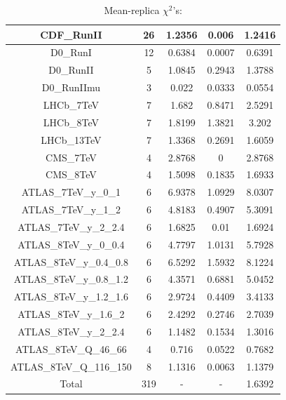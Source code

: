 \documentclass[
]{article}
\begin{document}
\begin{table}[h]
\begin{tabular}{|c|c|c|c|c|}
CDF\_RunII & 26 & 1.2356 & 0.006 & 1.2416 \\ \hline
D0\_RunI & 12 & 0.6384 & 0.0007 & 0.6391 \\ \hline
D0\_RunII & 5 & 1.0845 & 0.2943 & 1.3788 \\ \hline
D0\_RunIImu & 3 & 0.022 & 0.0333 & 0.0554 \\ \hline
LHCb\_7TeV & 7 & 1.682 & 0.8471 & 2.5291 \\ \hline
LHCb\_8TeV & 7 & 1.8199 & 1.3821 & 3.202 \\ \hline
LHCb\_13TeV & 7 & 1.3368 & 0.2691 & 1.6059 \\ \hline
CMS\_7TeV & 4 & 2.8768 & 0 & 2.8768 \\ \hline
CMS\_8TeV & 4 & 1.5098 & 0.1835 & 1.6933 \\ \hline
ATLAS\_7TeV\_y\_0\_1 & 6 & 6.9378 & 1.0929 & 8.0307 \\ \hline
ATLAS\_7TeV\_y\_1\_2 & 6 & 4.8183 & 0.4907 & 5.3091 \\ \hline
ATLAS\_7TeV\_y\_2\_2.4 & 6 & 1.6825 & 0.01 & 1.6924 \\ \hline
ATLAS\_8TeV\_y\_0\_0.4 & 6 & 4.7797 & 1.0131 & 5.7928 \\ \hline
ATLAS\_8TeV\_y\_0.4\_0.8 & 6 & 6.5292 & 1.5932 & 8.1224 \\ \hline
ATLAS\_8TeV\_y\_0.8\_1.2 & 6 & 4.3571 & 0.6881 & 5.0452 \\ \hline
ATLAS\_8TeV\_y\_1.2\_1.6 & 6 & 2.9724 & 0.4409 & 3.4133 \\ \hline
ATLAS\_8TeV\_y\_1.6\_2 & 6 & 2.4292 & 0.2746 & 2.7039 \\ \hline
ATLAS\_8TeV\_y\_2\_2.4 & 6 & 1.1482 & 0.1534 & 1.3016 \\ \hline
ATLAS\_8TeV\_Q\_46\_66 & 4 & 0.716 & 0.0522 & 0.7682 \\ \hline
ATLAS\_8TeV\_Q\_116\_150 & 8 & 1.1316 & 0.0063 & 1.1379 \\ \hline
Total & 319 & - & - & 1.6392 \\ \hline

\end{tabular}

\caption{Mean-replica \(\chi^2\)'s:}

\end{table}
\end{document}
